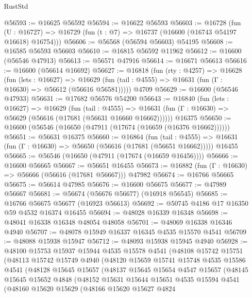 \begin{lexlean}{RustStd}
\begin{coremodule}
{\begin{coremodule}
{{{{{{{{{{{{{{{{{{{{{{{{{{{{{{{{{{{{{{{{{{{{{{{{{{{{{{{@56593 := @16625 @56592
@56594 := @16622 @56593
@56603 := @16728
    (fun (U : @16727) => @16729 (fun (t : @7) => @16737 (@16600 (@16743 @54197 @16618) @16754)))
@56606 := @56568 (@56594 @56603) @54195
@56608 := @16585 @56593 @56603
@56610 := @16815 @56592 @11962
@56612 := @16600 (@56546 @47913)
@56613 := @56571 @47916
@56614 := @16671 @56613
@56616 := @16600 (@56614 @16692)
@56627 := @16818
    (fun (rty : @4257) =>
    @16628
      (fun (lets : @16627) =>
      @16629 (fun (tail : @4555) => @16631 (fun (Γ : @16630) => @56612 (@56616 @56581)))))
    @4709
@56629 := @16600 (@56546 @47933)
@56631 := @17682 @56576 @54200
@56643 := @16840
    (fun (lets : @16627) =>
    @16629
      (fun (tail : @4555) =>
      @16631 (fun (Γ : @16630) => @56629 (@56616 (@17681 (@56631 @16660 @16662))))))
    @16375
@56650 := @16600 (@56546 (@16650 (@47911 (@17674 (@16659 (@16376 @16662))))))
@56651 := @56631 @16375
@56660 := @16864
    (fun (tail : @4555) => @16631 (fun (Γ : @16630) => @56650 (@56616 (@17681 (@56651 @16662)))))
    @16455
@56665 := @56546 (@16650 (@47911 (@17674 (@16659 @16456))))
@56666 := @16600 @56665
@56667 := @56651 @16455
@56673 := @16882 (fun (Γ : @16630) => @56666 (@56616 (@17681 @56667))) @47982
@56674 := @16766 @56665
@56675 := @56614 @47985
@56676 := @16600 @56675
@56677 := @47989 @56667
@56681 := @56674 (@56676 @56677) (@16918 @56545)
@56685 := @16766 @56675 @56677 (@16923 @56613)
@56692 := @50745 @4186 @17 @16350 @59 @4532 @16374 @16455
@56694 := @48028 @16339 @16348
@56698 := @48041 @16338 @16348 @48054 @48058
@56701 := @48069 @16338 @16346 @4940
@56707 := @48078 @15949 @16337 @16345 @4535 @15570 @4541
@56709 := @48088 @15938 @15947
@56712 := @48093 @15938 @15945 @4940
@56928 := @48100
    @15753
    @15937
    @15944
    @4535
    @15578
    @4541
    (@48108
      @15742
      @15751
      (@48113
        @15742
        @15749
        @4940
        (@48120
          @15659
          @15741
          @15748
          @4535
          @15586
          @4541
          (@48128
            @15645
            @15657
            (@48137
              @15645
              @15654
              @4547
              @15657
              (@48145
                @15645
                @15652
                @4848
                (@48152
                  @15631
                  @15644
                  @15651
                  @4535
                  @15594
                  @4541
                  (@48160
                    @15620
                    @15629
                    (@48166
                      @15620
                      @15627
                      @4824
}}}}}}}}}}}}}}}}}}}}}}}}}}}}}}}}}}}}}}}}}}}}}}}}}}}}}}}
\end{coremodule}}
\end{coremodule}
\end{lexlean}

